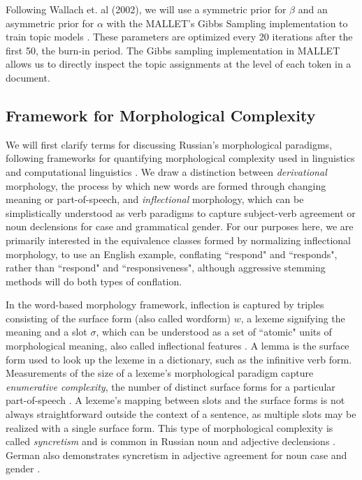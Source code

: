 \documentclass[11pt,a4paper]{article}
\begin{document}
Following Wallach et. al (2002), we will use a symmetric prior for $\beta$ and an asymmetric prior for $\alpha$ with the MALLET's Gibbs Sampling implementation to train topic models \cite{wallach2009rethinking,McCallumMALLET}. These parameters are optimized every 20 iterations after the first 50, the burn-in period. The Gibbs sampling implementation in MALLET allows us to directly inspect the topic assignments at the level of each token in a document.

\subsection{Framework for Morphological Complexity}
We will first clarify terms for discussing Russian's morphological paradigms, following frameworks for quantifying morphological complexity used in linguistics and computational linguistics \cite{baerman2015intro,Ackerman2013MorphologicalOT, cotterell-etal-2019-complexity}. We draw a distinction between \textit{derivational} morphology, the process by which new words are formed through changing meaning or part-of-speech, and \textit{inflectional} morphology, which can be simplistically understood as verb paradigms to capture subject-verb agreement or noun declensions for case and grammatical gender. For our purposes here, we are primarily interested in the equivalence classes formed by normalizing inflectional morphology, to use an English example, conflating ``respond" and ``responds", rather than ``respond" and ``responsiveness", although aggressive stemming methods will do both types of conflation.

In the word-based morphology framework, inflection is captured by triples consisting of the surface form (also called wordform) $w$, a lexeme  signifying the meaning and a slot $\sigma$, which can be understood as a set of ``atomic" units of morphological meaning, also called inflectional features \cite{aronoff1976word,sylak-glassman-etal-2015-language,cotterell-etal-2019-complexity}.
A lemma is the surface form used to look up the lexeme in a dictionary, such as the infinitive verb form. Measurements of the size of a lexeme's morphological paradigm capture \textit{enumerative complexity}, the number of distinct surface forms for a particular part-of-speech \cite{Ackerman2013MorphologicalOT}. A lexeme's mapping between slots and the surface forms is not always straightforward outside the context of a sentence, as multiple slots may be realized with a single surface form. This type of morphological complexity is called \textit{syncretism} and is common in Russian noun and adjective declensions \cite{baerman2015understanding,Milizia2015PatternsOS}. German also demonstrates syncretism in adjective agreement for noun case and gender \cite{Crysmann2005SyncretismIG}.
\end{document}
